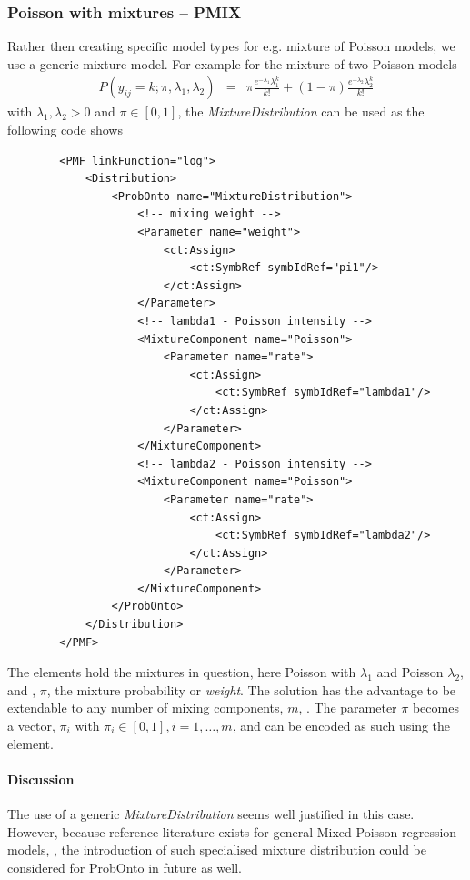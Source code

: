 {\subsubsection{Poisson with mixtures -- PMIX}
Rather then creating specific model types for e.g. mixture of Poisson models, 
we use a generic mixture model. For example for the mixture of two Poisson models
\begin{eqnarray}
P(y_{ij} = k;\pi,\lambda_1,\lambda_2) &=& \pi \frac{e^{-\lambda_1} \lambda_1^k}{k!} + (1-\pi) \frac{e^{-\lambda_2} \lambda_2^k}{k!} \nonumber
\end{eqnarray}
with $\lambda_1, \lambda_2 > 0$ and $\pi \in [0,1]$, the \emph{MixtureDistribution} 
can be used as the following code shows
\lstset{language=XML}
\begin{lstlisting}
        <PMF linkFunction="log">
            <Distribution>
                <ProbOnto name="MixtureDistribution">
                    <!-- mixing weight -->
                    <Parameter name="weight">
                        <ct:Assign>
                            <ct:SymbRef symbIdRef="pi1"/>
                        </ct:Assign>
                    </Parameter>
                    <!-- lambda1 - Poisson intensity -->
                    <MixtureComponent name="Poisson">
                        <Parameter name="rate">
                            <ct:Assign>
                                <ct:SymbRef symbIdRef="lambda1"/>
                            </ct:Assign>
                        </Parameter>
                    </MixtureComponent>
                    <!-- lambda2 - Poisson intensity -->
                    <MixtureComponent name="Poisson">
                        <Parameter name="rate">
                            <ct:Assign>
                                <ct:SymbRef symbIdRef="lambda2"/>
                            </ct:Assign>
                        </Parameter>
                    </MixtureComponent>
                </ProbOnto>
            </Distribution>
        </PMF>
\end{lstlisting}
The  elements hold the mixtures in question, here
Poisson with $\lambda_1$ and Poisson $\lambda_2$, and 
, $\pi$, the mixture probability or \emph{weight}. The solution has the advantage 
to be extendable to any number of mixing components, $m$, \cite{forbes2011statistical}. 
The parameter $\pi$ becomes a vector, $\pi_i \text{ with } \pi_i \in [0,1], i=1,\dots,m$, 
and can be encoded as such using the  element.
\paragraph{Discussion}
The use of a generic \emph{MixtureDistribution} seems well justified in this case. 
However, because reference literature exists for general Mixed Poisson regression models, 
\cite{Wang:1996fj}, the introduction of such specialised mixture distribution 
could be considered for ProbOnto in future as well.



}
